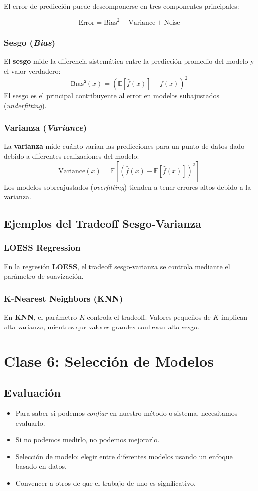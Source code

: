 \documentclass[a4paper, 11pt]{article}
\begin{document}
El error de predicción puede descomponerse en tres componentes principales:

\[
\text{Error} = \text{Bias}^2 + \text{Variance} + \text{Noise}
\]

\subsubsection{Sesgo (\textit{Bias})}
El \textbf{sesgo} mide la diferencia sistemática entre la predicción promedio del modelo y el valor verdadero:
\[
\text{Bias}^2(x) = \left( \mathbb{E}[\hat{f}(x)] - f(x) \right)^2
\]
El sesgo es el principal contribuyente al error en modelos subajustados (\textit{underfitting}).

\subsubsection{Varianza (\textit{Variance})}
La \textbf{varianza} mide cuánto varían las predicciones para un punto de datos dado debido a diferentes realizaciones del modelo:
\[
\text{Variance}(x) = \mathbb{E}\left[\left( \hat{f}(x) - \mathbb{E}[\hat{f}(x)] \right)^2 \right]
\]
Los modelos sobreajustados (\textit{overfitting}) tienden a tener errores altos debido a la varianza.

\subsection{Ejemplos del Tradeoff Sesgo-Varianza}
\subsubsection{LOESS Regression}
En la regresión \textbf{LOESS}, el tradeoff sesgo-varianza se controla mediante el parámetro de suavización.

\subsubsection{K-Nearest Neighbors (KNN)}
En \textbf{KNN}, el parámetro \(K\) controla el tradeoff. Valores pequeños de \(K\) implican alta varianza, mientras que valores grandes conllevan alto sesgo.
\newpage
\section{Clase 6: Selección de Modelos}

\subsection{Evaluación}
\begin{itemize}
    \item Para saber si podemos \textit{confiar} en nuestro método o sistema, necesitamos evaluarlo.
    \item Si no podemos medirlo, no podemos mejorarlo.
    \item Selección de modelo: elegir entre diferentes modelos usando un enfoque basado en datos.
    \item Convencer a otros de que el trabajo de uno es significativo.
\end{itemize}
\end{document}
